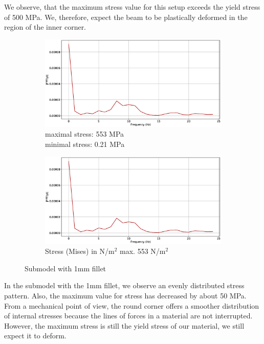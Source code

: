 \documentclass[12pt]{article}
\begin{document}
We observe, that the maximum stress value for this setup exceeds the yield stress of 500 MPa. 
We, therefore, expect the beam to be plastically deformed in the region of the inner corner.

\begin{figure}[!htb]
  \centering
  \begin{subfigure}{.5\textwidth}
    \centering
    \includegraphics[width=0.95\linewidth]{pics/vib_fourier}
    \caption{maximal stress: 553 MPa \\\hspace{\textwidth}minimal stress: 0.21 MPa}
  \end{subfigure}%
  \begin{subfigure}{.5\textwidth}
    \centering
    \includegraphics[width=0.95\linewidth]{pics/vib_fourier}
    \caption{Stress (Mises) in N/m$^{2}$ max. 553 N/m$^{2}$}
   \end{subfigure}
  \caption{Submodel with 1mm fillet}
\end{figure}

In the submodel with the 1mm fillet, we observe an evenly distributed stress pattern. Also,
the maximum value for stress has decreased by about 50 MPa. From a mechanical point of view, 
the round corner offers a smoother distribution of internal stresses because the lines of 
forces in a material are not interrupted. However, the maximum stress is still the yield 
stress of our material, we still expect it to deform.
\pagebreak
\end{document}

